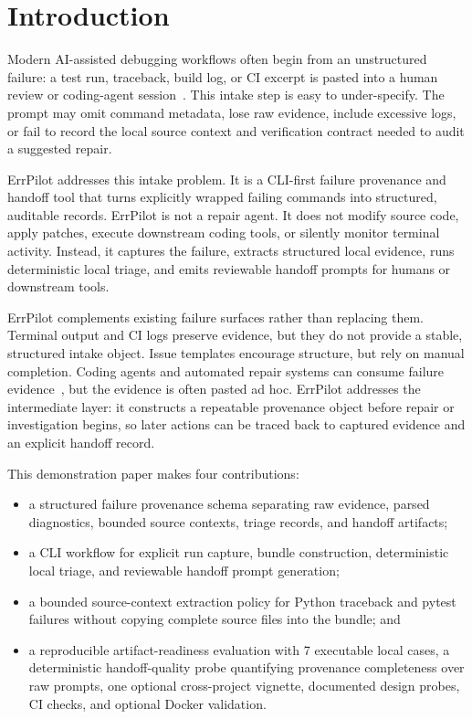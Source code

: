 \documentclass[sigconf]{acmart}
\begin{document}
\maketitle

\section{Introduction}

Modern AI-assisted debugging workflows often begin from an unstructured failure:
a test run, traceback, build log, or CI excerpt is pasted into a human review or
coding-agent session~\cite{swe-agent}. This intake step is easy to
under-specify. The prompt may omit command metadata, lose raw evidence, include
excessive logs, or fail to record the local source context and verification
contract needed to audit a suggested repair.

ErrPilot addresses this intake problem. It is a CLI-first failure provenance and
handoff tool that turns explicitly wrapped failing commands into structured,
auditable records. ErrPilot is not a repair agent. It does not modify source
code, apply patches, execute downstream coding tools, or silently monitor
terminal activity. Instead, it captures the failure, extracts structured local
evidence, runs deterministic local triage, and emits reviewable handoff prompts
for humans or downstream tools.

ErrPilot complements existing failure surfaces rather than replacing them.
Terminal output and CI logs preserve evidence, but they do not provide a stable,
structured intake object. Issue templates encourage structure, but rely on
manual completion. Coding agents and automated repair systems can consume
failure evidence~\cite{swe-agent,legoues-genprog}, but the evidence is often
pasted ad hoc. ErrPilot addresses the intermediate layer: it constructs a
repeatable provenance object before repair or investigation begins, so later
actions can be traced back to captured evidence and an explicit handoff record.

This demonstration paper makes four contributions:
\begin{itemize}
  \item a structured failure provenance schema separating raw evidence, parsed
  diagnostics, bounded source contexts, triage records, and handoff artifacts;
  \item a CLI workflow for explicit run capture, bundle construction,
  deterministic local triage, and reviewable handoff prompt generation;
  \item a bounded source-context extraction policy for Python traceback and
  pytest failures without copying complete source files into the bundle; and
  \item a reproducible artifact-readiness evaluation with 7 executable local
  cases, a deterministic handoff-quality probe quantifying provenance
  completeness over raw prompts, one optional cross-project vignette,
  documented design probes, CI checks, and optional Docker validation.
\end{itemize}
\end{document}
